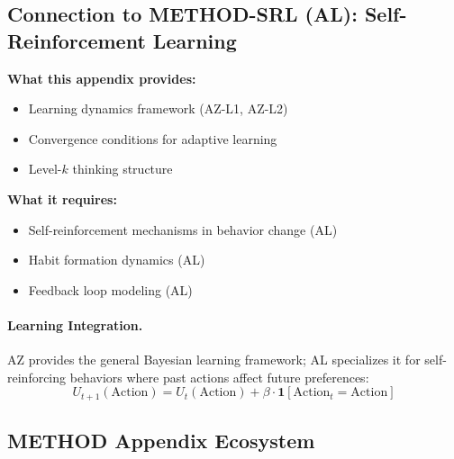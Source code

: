 \subsection{Connection to METHOD-SRL (AL): Self-Reinforcement Learning}

\begin{tcolorbox}[colback=yellow!5!white, colframe=yellow!75!black,
    title=Integration: METHOD-CONSTRUCT $\leftrightarrow$ METHOD-SRL (AL)]
\textbf{What this appendix provides:}
\begin{itemize}[nosep]
\item Learning dynamics framework (AZ-L1, AZ-L2)
\item Convergence conditions for adaptive learning
\item Level-$k$ thinking structure
\end{itemize}

\textbf{What it requires:}
\begin{itemize}[nosep]
\item Self-reinforcement mechanisms in behavior change (AL)
\item Habit formation dynamics (AL)
\item Feedback loop modeling (AL)
\end{itemize}
\end{tcolorbox}

\paragraph{Learning Integration.}
AZ provides the general Bayesian learning framework; AL specializes it for
self-reinforcing behaviors where past actions affect future preferences:
\begin{equation}
U_{t+1}(\text{Action}) = U_t(\text{Action}) + \beta \cdot \mathbf{1}[\text{Action}_t = \text{Action}]
\end{equation}

\subsection{METHOD Appendix Ecosystem}

